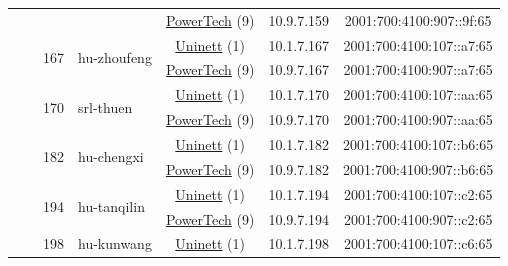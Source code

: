 \begin{small}
\begin{center}
\begin{longtable}{|c|c|c|c|c|c|c|c|}
  &  &  &  & \multicolumn{2}{|c|}{\tiny{\href{http://www.powertech.no}{PowerTech} (9)}} & \tiny{10.9.7.159} & \tiny{2001:700:4100:907::9f:65} \\* \cline{3-3}\cline{4-4}\cline{5-5}\cline{6-6}\cline{7-7}\cline{8-8}
  &  & \multirow{2}{*}{\tiny{167}} & \multicolumn{1}{|l|}{\multirow{2}{*}{\tiny{hu-zhoufeng}}} & \multicolumn{2}{|c|}{\tiny{\href{https://www.uninett.no}{Uninett} (1)}} & \tiny{10.1.7.167} & \tiny{2001:700:4100:107::a7:65} \\* \cline{5-5}\cline{6-6}\cline{7-7}\cline{8-8}
  &  &  &  & \multicolumn{2}{|c|}{\tiny{\href{http://www.powertech.no}{PowerTech} (9)}} & \tiny{10.9.7.167} & \tiny{2001:700:4100:907::a7:65} \\* \cline{3-3}\cline{4-4}\cline{5-5}\cline{6-6}\cline{7-7}\cline{8-8}
  &  & \multirow{2}{*}{\tiny{170}} & \multicolumn{1}{|l|}{\multirow{2}{*}{\tiny{srl-thuen}}} & \multicolumn{2}{|c|}{\tiny{\href{https://www.uninett.no}{Uninett} (1)}} & \tiny{10.1.7.170} & \tiny{2001:700:4100:107::aa:65} \\* \cline{5-5}\cline{6-6}\cline{7-7}\cline{8-8}
  &  &  &  & \multicolumn{2}{|c|}{\tiny{\href{http://www.powertech.no}{PowerTech} (9)}} & \tiny{10.9.7.170} & \tiny{2001:700:4100:907::aa:65} \\* \cline{3-3}\cline{4-4}\cline{5-5}\cline{6-6}\cline{7-7}\cline{8-8}
  &  & \multirow{2}{*}{\tiny{182}} & \multicolumn{1}{|l|}{\multirow{2}{*}{\tiny{hu-chengxi}}} & \multicolumn{2}{|c|}{\tiny{\href{https://www.uninett.no}{Uninett} (1)}} & \tiny{10.1.7.182} & \tiny{2001:700:4100:107::b6:65} \\* \cline{5-5}\cline{6-6}\cline{7-7}\cline{8-8}
  &  &  &  & \multicolumn{2}{|c|}{\tiny{\href{http://www.powertech.no}{PowerTech} (9)}} & \tiny{10.9.7.182} & \tiny{2001:700:4100:907::b6:65} \\* \cline{3-3}\cline{4-4}\cline{5-5}\cline{6-6}\cline{7-7}\cline{8-8}
  &  & \multirow{2}{*}{\tiny{194}} & \multicolumn{1}{|l|}{\multirow{2}{*}{\tiny{hu-tanqilin}}} & \multicolumn{2}{|c|}{\tiny{\href{https://www.uninett.no}{Uninett} (1)}} & \tiny{10.1.7.194} & \tiny{2001:700:4100:107::c2:65} \\* \cline{5-5}\cline{6-6}\cline{7-7}\cline{8-8}
  &  &  &  & \multicolumn{2}{|c|}{\tiny{\href{http://www.powertech.no}{PowerTech} (9)}} & \tiny{10.9.7.194} & \tiny{2001:700:4100:907::c2:65} \\* \cline{3-3}\cline{4-4}\cline{5-5}\cline{6-6}\cline{7-7}\cline{8-8}
  &  & \multirow{2}{*}{\tiny{198}} & \multicolumn{1}{|l|}{\multirow{2}{*}{\tiny{hu-kunwang}}} & \multicolumn{2}{|c|}{\tiny{\href{https://www.uninett.no}{Uninett} (1)}} & \tiny{10.1.7.198} & \tiny{2001:700:4100:107::c6:65} \\* \cline{5-5}\cline{6-6}\cline{7-7}\cline{8-8}

\end{longtable}
\end{center}
\end{small}

